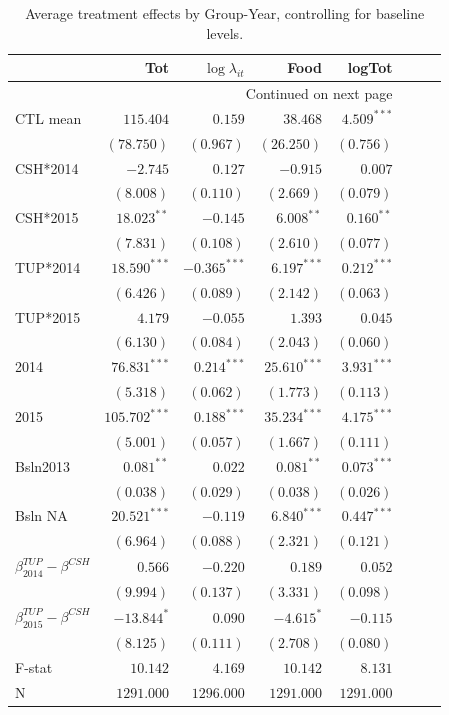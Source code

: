 \documentclass[12pt,article]{article}
\begin{document}
\begin{longtable}{lrrrrrrr}
\caption{\label{tab:consumption}Average treatment effects by Group-Year, controlling for baseline levels.}
\\
\hline
 & Tot & $\log\lambda_{it}$ & Food & logTot\\
\hline
\endhead
\hline\multicolumn{5}{r}{Continued on next page} \\
\endfoot
\endlastfoot
CTL mean & $115.404$ & $0.159$ & $38.468$ & $4.509^{***}$\\
 & $(78.750)$ & $(0.967)$ & $(26.250)$ & $(0.756)$\\
\hline
CSH*2014 & $-2.745$ & $0.127$ & $-0.915$ & $0.007$\\
 & $(8.008)$ & $(0.110)$ & $(2.669)$ & $(0.079)$\\
CSH*2015 & $18.023^{**}$ & $-0.145$ & $6.008^{**}$ & $0.160^{**}$\\
 & $(7.831)$ & $(0.108)$ & $(2.610)$ & $(0.077)$\\
TUP*2014 & $18.590^{***}$ & $-0.365^{***}$ & $6.197^{***}$ & $0.212^{***}$\\
 & $(6.426)$ & $(0.089)$ & $(2.142)$ & $(0.063)$\\
TUP*2015 & $4.179$ & $-0.055$ & $1.393$ & $0.045$\\
 & $(6.130)$ & $(0.084)$ & $(2.043)$ & $(0.060)$\\
2014 & $76.831^{***}$ & $0.214^{***}$ & $25.610^{***}$ & $3.931^{***}$\\
 & $(5.318)$ & $(0.062)$ & $(1.773)$ & $(0.113)$\\
2015 & $105.702^{***}$ & $0.188^{***}$ & $35.234^{***}$ & $4.175^{***}$\\
 & $(5.001)$ & $(0.057)$ & $(1.667)$ & $(0.111)$\\
Bsln2013 & $0.081^{**}$ & $0.022$ & $0.081^{**}$ & $0.073^{***}$\\
 & $(0.038)$ & $(0.029)$ & $(0.038)$ & $(0.026)$\\
Bsln NA & $20.521^{***}$ & $-0.119$ & $6.840^{***}$ & $0.447^{***}$\\
 & $(6.964)$ & $(0.088)$ & $(2.321)$ & $(0.121)$\\
\hline
$\beta^{TUP}_{2014}-\beta^{CSH}$ & $0.566$ & $-0.220$ & $0.189$ & $0.052$\\
 & $(9.994)$ & $(0.137)$ & $(3.331)$ & $(0.098)$\\
$\beta^{TUP}_{2015}-\beta^{CSH}$ & $-13.844^{*}$ & $0.090$ & $-4.615^{*}$ & $-0.115$\\
 & $(8.125)$ & $(0.111)$ & $(2.708)$ & $(0.080)$\\
\hline
F-stat & $10.142$ & $4.169$ & $10.142$ & $8.131$\\
N & $1291.000$ & $1296.000$ & $1291.000$ & $1291.000$\\
\hline
\end{longtable}
\end{document}
